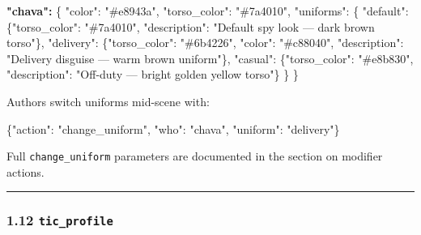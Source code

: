 \documentclass[
  11pt,
]{book}
\newenvironment{Shaded}{}{}
\newcommand{\DataTypeTok}[1]{\textcolor[rgb]{0.56,0.13,0.00}{#1}}
\newcommand{\ErrorTok}[1]{\textcolor[rgb]{1.00,0.00,0.00}{\textbf{#1}}}
\newcommand{\FunctionTok}[1]{\textcolor[rgb]{0.02,0.16,0.49}{#1}}
\newcommand{\StringTok}[1]{\textcolor[rgb]{0.25,0.44,0.63}{#1}}
\begin{document}
\begin{Shaded}
\begin{Highlighting}[]
\ErrorTok{"chava":} \FunctionTok{\{}
  \DataTypeTok{"color"}\FunctionTok{:} \StringTok{"\#e8943a"}\FunctionTok{,}
  \DataTypeTok{"torso\_color"}\FunctionTok{:} \StringTok{"\#7a4010"}\FunctionTok{,}
  \DataTypeTok{"uniforms"}\FunctionTok{:} \FunctionTok{\{}
    \DataTypeTok{"default"}\FunctionTok{:}  \FunctionTok{\{}\DataTypeTok{"torso\_color"}\FunctionTok{:} \StringTok{"\#7a4010"}\FunctionTok{,}
                 \DataTypeTok{"description"}\FunctionTok{:} \StringTok{"Default spy look — dark brown torso"}\FunctionTok{\},}
    \DataTypeTok{"delivery"}\FunctionTok{:} \FunctionTok{\{}\DataTypeTok{"torso\_color"}\FunctionTok{:} \StringTok{"\#6b4226"}\FunctionTok{,} \DataTypeTok{"color"}\FunctionTok{:} \StringTok{"\#c88040"}\FunctionTok{,}
                 \DataTypeTok{"description"}\FunctionTok{:} \StringTok{"Delivery disguise — warm brown uniform"}\FunctionTok{\},}
    \DataTypeTok{"casual"}\FunctionTok{:}   \FunctionTok{\{}\DataTypeTok{"torso\_color"}\FunctionTok{:} \StringTok{"\#e8b830"}\FunctionTok{,}
                 \DataTypeTok{"description"}\FunctionTok{:} \StringTok{"Off{-}duty — bright golden yellow torso"}\FunctionTok{\}}
  \FunctionTok{\}}
\FunctionTok{\}}
\end{Highlighting}
\end{Shaded}

Authors switch uniforms mid-scene with:

\begin{Shaded}
\begin{Highlighting}[]
\FunctionTok{\{}\DataTypeTok{"action"}\FunctionTok{:} \StringTok{"change\_uniform"}\FunctionTok{,} \DataTypeTok{"who"}\FunctionTok{:} \StringTok{"chava"}\FunctionTok{,} \DataTypeTok{"uniform"}\FunctionTok{:} \StringTok{"delivery"}\FunctionTok{\}}
\end{Highlighting}
\end{Shaded}

Full \texttt{change\_uniform} parameters are documented in the section on
modifier actions.

\begin{center}\rule{0.5\linewidth}{0.5pt}\end{center}

\subsubsection{\texorpdfstring{1.12
\texttt{tic\_profile}}{1.12 tic\_profile}}\label{tic_profile}
\end{document}
